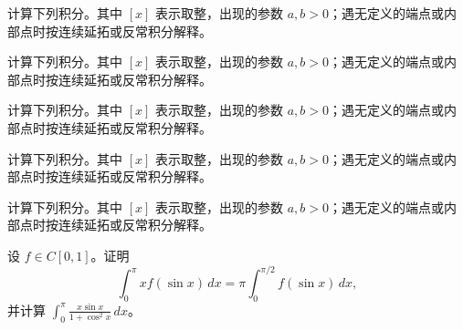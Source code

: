 \noindent\begin{minipage}{\textwidth}
计算下列积分。其中 $[x]$ 表示取整，出现的参数 $a,b>0$；遇无定义的端点或内部点时按连续延拓或反常积分解释。
\end{minipage}\par\vfill
\newpage
\noindent\begin{minipage}{\textwidth}
计算下列积分。其中 $[x]$ 表示取整，出现的参数 $a,b>0$；遇无定义的端点或内部点时按连续延拓或反常积分解释。
\end{minipage}\par\vfill
\noindent\begin{minipage}{\textwidth}
计算下列积分。其中 $[x]$ 表示取整，出现的参数 $a,b>0$；遇无定义的端点或内部点时按连续延拓或反常积分解释。
\end{minipage}\par\vfill
\noindent\begin{minipage}{\textwidth}
计算下列积分。其中 $[x]$ 表示取整，出现的参数 $a,b>0$；遇无定义的端点或内部点时按连续延拓或反常积分解释。
\end{minipage}\par\vfill
\noindent\begin{minipage}{\textwidth}
计算下列积分。其中 $[x]$ 表示取整，出现的参数 $a,b>0$；遇无定义的端点或内部点时按连续延拓或反常积分解释。
\end{minipage}\par\vfill
\newpage
\noindent\begin{minipage}{\textwidth}
设 $f\in C[0,1]$。证明\[\int_0^\pi x f(\sin x)\,dx=\pi\int_0^{\pi/2}f(\sin x)\,dx,\]并计算 $\displaystyle\int_0^\pi\frac{x\sin x}{1+\cos^2x}\,dx$。
\end{minipage}\par\vfill
